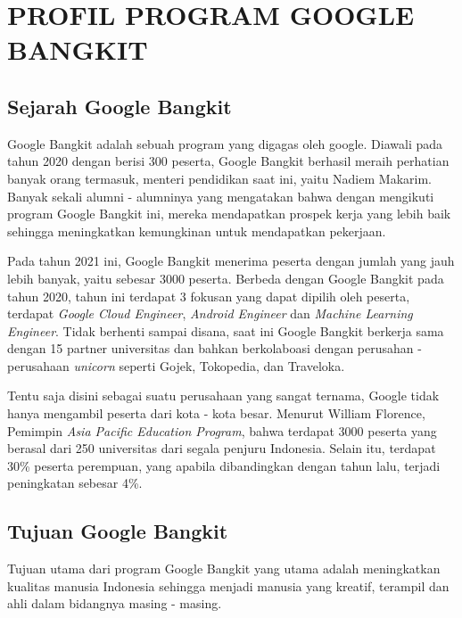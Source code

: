 \chapter{PROFIL PROGRAM GOOGLE BANGKIT}


\section{Sejarah Google Bangkit}

Google Bangkit adalah sebuah program yang digagas oleh google. Diawali pada tahun 2020 dengan berisi 300 peserta, Google Bangkit berhasil meraih perhatian banyak orang termasuk, menteri pendidikan saat ini, yaitu Nadiem Makarim. Banyak sekali alumni - alumninya yang mengatakan bahwa dengan mengikuti program Google Bangkit ini, mereka mendapatkan prospek kerja yang lebih baik sehingga meningkatkan kemungkinan untuk mendapatkan pekerjaan.

Pada tahun 2021 ini, Google Bangkit menerima peserta dengan jumlah yang jauh lebih banyak, yaitu sebesar 3000 peserta. Berbeda dengan Google Bangkit pada tahun 2020, tahun ini terdapat 3 fokusan yang dapat dipilih oleh peserta, terdapat \textit{Google Cloud Engineer}, \textit{Android Engineer} dan \textit{Machine Learning Engineer}. Tidak berhenti sampai disana, saat ini Google Bangkit berkerja sama dengan 15 partner universitas dan bahkan berkolaboasi dengan perusahan - perusahaan \textit{unicorn} seperti Gojek, Tokopedia, dan Traveloka.

Tentu saja disini sebagai suatu perusahaan yang sangat ternama, Google tidak hanya mengambil peserta dari kota - kota besar. Menurut William Florence, Pemimpin \textit{Asia Pacific Education Program}, bahwa terdapat 3000 peserta yang berasal dari 250 universitas dari segala penjuru Indonesia.  Selain itu, terdapat 30\% peserta perempuan, yang apabila dibandingkan dengan tahun lalu, terjadi peningkatan sebesar 4\%.

\section{Tujuan Google Bangkit}

Tujuan utama dari program Google Bangkit yang utama adalah meningkatkan kualitas manusia Indonesia sehingga menjadi manusia yang kreatif, terampil dan ahli dalam bidangnya masing - masing.

